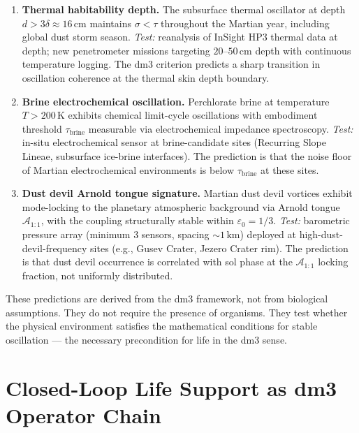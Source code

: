 \begin{enumerate}

\item \textbf{Thermal habitability depth.}
The subsurface thermal oscillator at depth $d > 3\delta \approx 16\,\mathrm{cm}$
maintains $\sigma < \tau$ throughout the Martian year, including global
dust storm season. \emph{Test:} reanalysis of InSight HP3 thermal data
at depth; new penetrometer missions targeting $20$--$50\,\mathrm{cm}$
depth with continuous temperature logging. The dm3 criterion predicts
a sharp transition in oscillation coherence at the thermal skin depth
boundary.

\item \textbf{Brine electrochemical oscillation.}
Perchlorate brine at temperature $T > 200\,\mathrm{K}$ exhibits
chemical limit-cycle oscillations with embodiment threshold $\tau_{\text{brine}}$
measurable via electrochemical impedance spectroscopy. \emph{Test:}
in-situ electrochemical sensor at brine-candidate sites (Recurring
Slope Lineae, subsurface ice-brine interfaces). The prediction is
that the noise floor of Martian electrochemical environments is below
$\tau_{\text{brine}}$ at these sites.

\item \textbf{Dust devil Arnold tongue signature.}
Martian dust devil vortices exhibit mode-locking to the planetary
atmospheric background via Arnold tongue $\mathcal{A}_{1:1}$, with
the coupling structurally stable within $\varepsilon_0 = 1/3$.
\emph{Test:} barometric pressure array (minimum 3 sensors, spacing
$\sim 1\,\mathrm{km}$) deployed at high-dust-devil-frequency sites
(e.g., Gusev Crater, Jezero Crater rim). The prediction is that
dust devil occurrence is correlated with sol phase at the
$\mathcal{A}_{1:1}$ locking fraction, not uniformly distributed.

\end{enumerate}

These predictions are derived from the dm3 framework, not from
biological assumptions. They do not require the presence of organisms.
They test whether the physical environment satisfies the mathematical
conditions for stable oscillation --- the necessary precondition
for life in the dm3 sense.

\section{Closed-Loop Life Support as dm3 Operator Chain}
\label{sec:mars-lifesupport}

